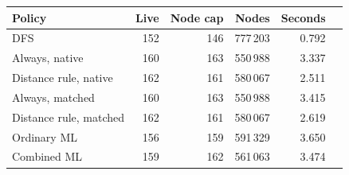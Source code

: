 \begin{tabular}{lrrrrr}
\toprule
Policy & Live & Node cap & Nodes & Seconds\\
\midrule
DFS & 152 & 146 & 777\,203 & 0.792\\
Always, native & 160 & 163 & 550\,988 & 3.337\\
Distance rule, native & 162 & 161 & 580\,067 & 2.511\\
Always, matched & 160 & 163 & 550\,988 & 3.415\\
Distance rule, matched & 162 & 161 & 580\,067 & 2.619\\
Ordinary ML & 156 & 159 & 591\,329 & 3.650\\
Combined ML & 159 & 162 & 561\,063 & 3.474\\
\bottomrule
\end{tabular}
